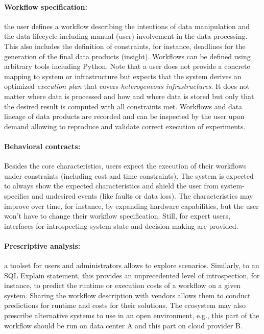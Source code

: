 \documentclass[a4paper, twocolumn]{article}
\begin{document}
\paragraph{Workflow specification:} the user defines a workflow describing the intentions of data manipulation and the data lifecycle including manual (user) involvement in the data processing.
This also includes the definition of constraints, for instance, deadlines for the generation of the final data products (insight).
Workflows can be defined using arbitrary tools including Python.
Note that a user does not provide a concrete mapping to system or infrastructure but expects that the system derives an optimized \textit{execution plan} that covers \textit{heterogeneous infrastructures}.
It does not matter where data is processed and how and where data is stored but only that the desired result is computed with all constraints met.
Workflows and data lineage of data products are recorded and can be inspected by the user upon demand allowing to reproduce and validate correct execution of experiments.


\paragraph{Behavioral contracts:}
Besides the core characteristics, users expect the execution of their workflows under constraints (including cost and time constraints).
The system is expected to always show the expected characteristics and shield the user from system-specifics and undesired events (like faults or data loss).
The characteristics may improve over time, for instance, by expanding hardware capabilities, but the user won't have to change their workflow specification.
Still, for expert users, interfaces for introspecting system state and decision making are provided.

\paragraph{Prescriptive analysis:} a toolset for users and administrators allows to explore scenarios.
Similarly, to an SQL Explain statement, this provides an unprecedented level of introspection, for instance, to predict the runtime or execution costs of a workflow on a given system.
Sharing the workflow description with vendors allows them to conduct predictions for runtime and costs for their solutions.
The ecosystem may also prescribe alternative systems to use in an open environment, e.g., this part of the workflow should be run on data center A and this part on cloud provider B.
\end{document}
